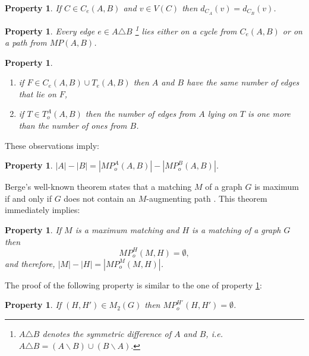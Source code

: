 \documentclass[a4paper, 12pt]{article}
\newtheorem{property}[definition]{Property}
\begin{document}
\begin{property}\label{altpathequaldegrees}
If $C \in C_e(A,B)$ and $v\in V(C)$ then $d_{C_A}(v) = d_{C_B}(v)$.
\end{property}

\begin{property}\label{edge_lies_on_alt_component}
Every edge $e \in A \triangle B$ \footnote{$A \triangle B$ denotes
the symmetric difference of $A$ and $B$, i.e. $A \triangle B = (A
\backslash B) \cup (B \backslash A).$} lies either on a cycle from
$C_e(A,B)$ or on a path from $MP(A,B)$.
\end{property}

\begin{property}\label{AB}\
\renewcommand{\labelenumi}{(\arabic{enumi})}
\begin{enumerate}
\item if $F \in C_e(A,B) \cup T_e(A,B)$ then $A$ and $B$ have the same number of edges that
lie on $F$,

\item if $T \in T_o^A(A,B)$ then the number of edges from $A$ lying on $T$ is one more than the number of ones from $B$.
\end{enumerate}
\end{property}

These observations imply:

\begin{property}\label{cardinalitydiff}
$|A|-|B|=|MP_{o}^{A}(A,B)|-|MP_{o}^{B}(A,B)|$.
\end{property}

Berge's well-known theorem states that a matching $M$ of a graph $G$
is maximum if and only if $G$ does not contain an $M$-augmenting
path \cite{Har, Lov-Plum, West}. This theorem immediately implies:

\begin{property}
\label{maxmatchingproperty} If $M$ is a maximum matching and $H$ is
a matching of a graph $G$ then
\begin{equation*}
MP_{o}^{H}(M,H)=\emptyset,
\end{equation*}and therefore, $|M|-|H|=|MP_{o}^{M}(M,H)|$.
\end{property}

The proof of the following property is similar to the one of
property \ref{maxmatchingproperty}:

\begin{property} \label{HH'}
If $(H,H')\in M_2(G)$ then $MP_o^{H'}(H,H') = \emptyset $.
\end{property}
\end{document}
